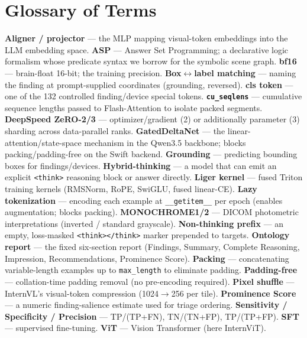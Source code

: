 \documentclass[11pt,a4paper]{article}
\begin{document}
\section{Glossary of Terms}
\label{app:glossary}
{\footnotesize
\textbf{Aligner / projector} --- the MLP mapping visual-token embeddings into the LLM embedding space.
\textbf{ASP} --- Answer Set Programming; a declarative logic formalism whose predicate syntax we borrow for the symbolic scene graph.
\textbf{bf16} --- brain-float 16-bit; the training precision.
\textbf{Box$\leftrightarrow$label matching} --- naming the finding at prompt-supplied coordinates (grounding, reversed).
\textbf{cls token} --- one of the 132 controlled finding/device special tokens.
\textbf{\texttt{cu\_seqlens}} --- cumulative sequence lengths passed to Flash-Attention to isolate packed segments.
\textbf{DeepSpeed ZeRO-2/3} --- optimizer/gradient (2) or additionally parameter (3) sharding across data-parallel ranks.
\textbf{GatedDeltaNet} --- the linear-attention/state-space mechanism in the Qwen3.5 backbone; blocks packing/padding-free on the Swift backend.
\textbf{Grounding} --- predicting bounding boxes for findings/devices.
\textbf{Hybrid-thinking} --- a model that can emit an explicit \texttt{<think>} reasoning block or answer directly.
\textbf{Liger kernel} --- fused Triton training kernels (RMSNorm, RoPE, SwiGLU, fused linear-CE).
\textbf{Lazy tokenization} --- encoding each example at \texttt{\_\_getitem\_\_} per epoch (enables augmentation; blocks packing).
\textbf{MONOCHROME1/2} --- DICOM photometric interpretations (inverted / standard grayscale).
\textbf{Non-thinking prefix} --- an empty, loss-masked \texttt{<think></think>} marker prepended to targets.
\textbf{Ontology report} --- the fixed six-section report (Findings, Summary, Complete Reasoning, Impression, Recommendations, Prominence Score).
\textbf{Packing} --- concatenating variable-length examples up to \texttt{max\_length} to eliminate padding.
\textbf{Padding-free} --- collation-time padding removal (no pre-encoding required).
\textbf{Pixel shuffle} --- InternVL's visual-token compression (1024$\rightarrow$256 per tile).
\textbf{Prominence Score} --- a numeric finding-salience estimate used for triage ordering.
\textbf{Sensitivity / Specificity / Precision} --- TP/(TP+FN), TN/(TN+FP), TP/(TP+FP).
\textbf{SFT} --- supervised fine-tuning.
\textbf{ViT} --- Vision Transformer (here InternViT).
}
\end{document}
